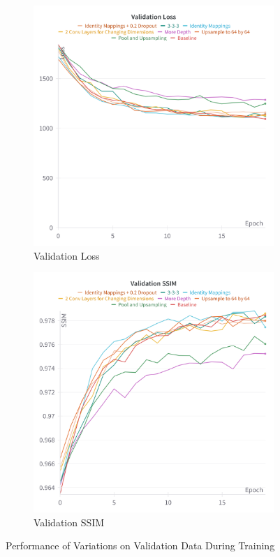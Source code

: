 \begin{figure}
    \centering
    \begin{subfigure}{.5\textwidth}
        \centering
        \includegraphics[width=\linewidth]{figures/architecture_variations/validations_loss.png}
        \caption{Validation Loss}
        \label{fig:sub1}
    \end{subfigure}%
    \begin{subfigure}{.5\textwidth}
        \centering
        \includegraphics[width=\linewidth]{figures/architecture_variations/validation_ssim.png}
        \caption{Validation SSIM}
        \label{fig:sub2}
    \end{subfigure}
    \caption{Performance of Variations on Validation Data During Training}
    \label{fig:test}
\end{figure}

